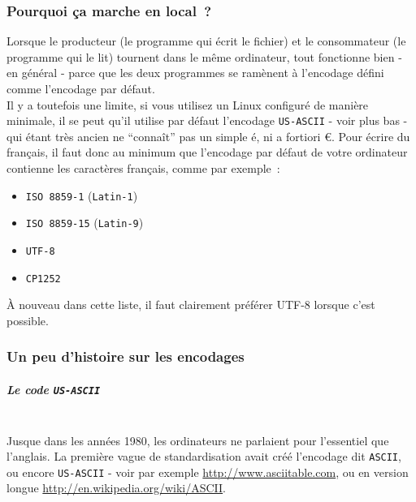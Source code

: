     \hypertarget{pourquoi-uxe7a-marche-en-local}{%
\subsubsection{Pourquoi ça marche en
local~?}\label{pourquoi-uxe7a-marche-en-local}}

    Lorsque le producteur (le programme qui écrit le fichier) et le
consommateur (le programme qui le lit) tournent dans le même ordinateur,
tout fonctionne bien - en général - parce que les deux programmes se
ramènent à l'encodage défini comme l'encodage par défaut.\\

Il y a toutefois une limite, si vous utilisez un Linux configuré de
manière minimale, il se peut qu'il utilise par défaut l'encodage
\texttt{US-ASCII} - voir plus bas - qui étant très ancien ne ``connaît''
pas un simple é, ni a fortiori €. Pour écrire du français, il faut donc
au minimum que l'encodage par défaut de votre ordinateur contienne les
caractères français, comme par exemple~:

\begin{itemize}
	\item 
	\texttt{ISO\ 8859-1} (\texttt{Latin-1})
	\item
	\texttt{ISO\ 8859-15} (\texttt{Latin-9})
	\item
	\texttt{UTF-8}
	\item
	\texttt{CP1252}
\end{itemize}

À nouveau dans cette liste, il faut clairement préférer UTF-8 lorsque
c'est possible.

    \hypertarget{un-peu-dhistoire-sur-les-encodages}{%
\subsubsection{Un peu d'histoire sur les
encodages}\label{un-peu-dhistoire-sur-les-encodages}}

    \hypertarget{le-code-us-ascii}{%
\subparagraph{\texorpdfstring{Le code
\texttt{US-ASCII}}{Le code US-ASCII}\\\\}\label{le-code-us-ascii}}

    Jusque dans les années 1980, les ordinateurs ne parlaient pour
l'essentiel que l'anglais. La première vague de standardisation avait
créé l'encodage dit \texttt{ASCII}, ou encore \texttt{US-ASCII} - voir
par exemple \href{http://www.asciitable.com}{http://www.asciitable.com}, ou en version longue
\href{http://en.wikipedia.org/wiki/ASCII}{http://en.wikipedia.org/wiki/ASCII}.\\

